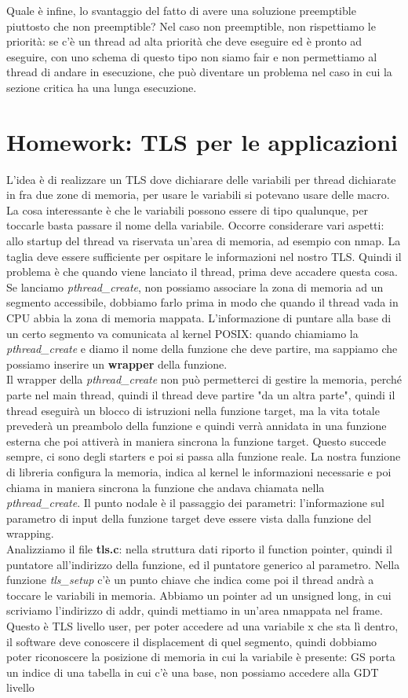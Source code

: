 \documentclass[12pt, oneside]{extbook}
\begin{document}
Quale è infine, lo svantaggio del fatto di avere una soluzione preemptible piuttosto che non preemptible? Nel caso non preemptible, non rispettiamo le priorità: se c'è un thread ad alta priorità che deve eseguire ed è pronto ad eseguire, con uno schema di questo tipo non siamo fair e non permettiamo al thread di andare in esecuzione, che può diventare un problema nel caso in cui la sezione critica ha una lunga esecuzione.
\section*{Homework: TLS per le applicazioni}
L'idea è di realizzare un TLS dove dichiarare delle variabili per thread dichiarate in fra due zone di memoria, per usare le variabili si potevano usare delle macro. La cosa interessante è che le variabili possono essere di tipo qualunque, per toccarle basta passare il nome della variabile. Occorre considerare vari aspetti: allo startup del thread va riservata un'area di memoria, ad esempio con nmap. La taglia deve essere sufficiente per ospitare le informazioni nel nostro TLS. Quindi il problema è che quando viene lanciato il thread, prima deve accadere questa cosa. Se lanciamo \textit{pthread\_create}, non possiamo associare la zona di memoria ad un segmento accessibile, dobbiamo farlo prima in modo che quando il thread vada in CPU abbia la zona di memoria mappata. L'informazione di puntare alla base di un certo segmento va comunicata al kernel POSIX: quando chiamiamo la \textit{pthread\_create} e diamo il nome della funzione che deve partire, ma sappiamo che possiamo inserire un \textbf{wrapper} della funzione.\\ Il wrapper della \textit{pthread\_create} non può permetterci di gestire la memoria, perché parte nel main thread, quindi il thread deve partire "da un altra parte", quindi il thread eseguirà un blocco di istruzioni nella funzione target, ma la vita totale prevederà un preambolo della funzione e quindi verrà annidata in una funzione esterna che poi attiverà in maniera sincrona la funzione target. Questo succede sempre, ci sono degli starters e poi si passa alla funzione reale. La nostra funzione di libreria configura la memoria, indica al kernel le informazioni necessarie e poi chiama in maniera sincrona la funzione che andava chiamata nella \textit{pthread\_create}. Il punto nodale è il passaggio dei parametri: l'informazione sul parametro di input della funzione target deve essere vista dalla funzione del wrapping.\\Analizziamo il file \textbf{tls.c}: nella struttura dati riporto il function pointer, quindi il puntatore all'indirizzo della funzione, ed il puntatore generico al parametro. Nella funzione \textit{tls\_setup} c'è un punto chiave che indica come poi il thread andrà a toccare le variabili in memoria. Abbiamo un pointer ad un unsigned long, in cui scriviamo l'indirizzo di addr, quindi mettiamo in un'area nmappata nel frame. Questo è TLS livello user, per poter accedere ad una variabile x che sta lì dentro, il software deve conoscere il displacement di quel segmento, quindi dobbiamo poter riconoscere la posizione di memoria in cui la variabile è presente: GS porta un indice di una tabella in cui c'è una base, non possiamo accedere alla GDT livello 
\end{document}
